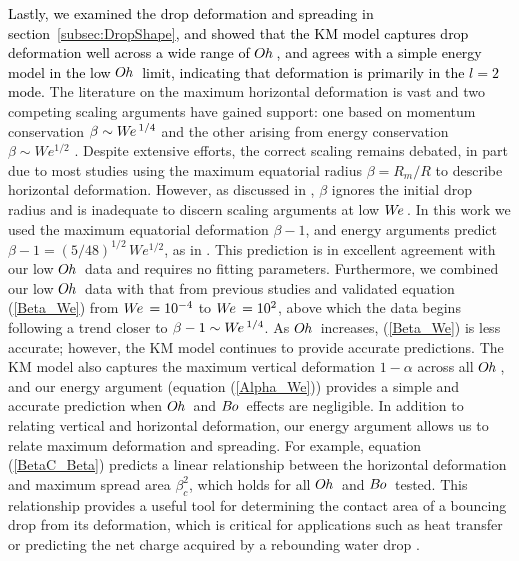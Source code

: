 \documentclass{jfm}
\newcommand{\edit}[1]{\textcolor{black}{#1}}
\newcommand{\We}{W\kern-0.15em e\,}
\newcommand{\Bo}{B\kern-0.05em o\,}
\newcommand{\Oh}{O\kern-0.05em h\,}
\begin{document}
\edit{Lastly, we examined the drop deformation and spreading in section~\ref{subsec:DropShape}, and showed that the KM model captures drop deformation well across a wide range of $\Oh$, and agrees with a simple energy model in the low $\Oh$ limit, indicating that deformation is primarily in the $l=2$ mode.} The literature on the maximum horizontal deformation is vast and two competing scaling arguments have gained support: one based on momentum conservation $\beta \sim \We^{1/4}$ \citep{clanet2004maximal,bartolo2005retraction,biance2006elasticity,tsai2011microscopic,garcia2020inclined} and the other arising from energy conservation $\beta \sim We^{1/2}$ \citep{chandra1991collision,bennett1993splat,okumura2003water,eggers2010drop,villermaux2011drop,laan2014maximum,lee2016universal}. Despite extensive efforts, the correct scaling remains debated, in part due to most studies using the maximum equatorial radius $\beta = R_{m} /R$ to describe horizontal deformation. However, as discussed in \citep{josserand2016drop}, $\beta$ ignores the initial drop radius and is inadequate to discern scaling arguments at low $\We$. In this work we used the maximum equatorial deformation $\beta-1$, and energy arguments predict $\beta-1 = \left(5/48\right)^{1/2} \, We^{1/2}$, as in \citet{richard2000bouncing}. This prediction is in excellent agreement with our low $\Oh$ data and requires no fitting parameters. Furthermore, we combined our low $\Oh$ data with that from previous studies and validated equation (\ref{Beta_We}) from $\We = 10^{-4}$ to $\We = 10^{2}$, above which the data begins following a trend closer to $ \beta - 1 \sim \We^{1/4}$. As $\Oh$ increases, (\ref{Beta_We}) is less accurate; however, the KM model continues to provide accurate predictions. The KM model also captures the maximum vertical deformation $1-\alpha$ across all $\Oh$, and our energy argument (equation (\ref{Alpha_We})) provides a simple and accurate prediction when $\Oh$ and $\Bo$ effects are negligible. In addition to relating vertical and horizontal deformation, our energy argument allows us to relate maximum deformation and spreading. For example, equation (\ref{BetaC_Beta}) predicts a linear relationship between the horizontal deformation and maximum spread area $\beta_c^2$, which holds for all $\Oh$ and $\Bo$ tested. This relationship provides a useful tool for determining the contact area of a bouncing drop from its deformation, which is critical for applications such as heat transfer \citep{shiri2017heat} or predicting the net charge acquired by a rebounding water drop \citep{diaz2022charging}.
\end{document}
